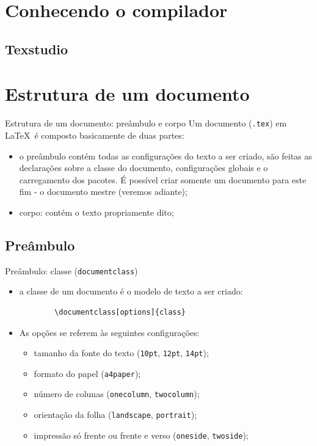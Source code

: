 \documentclass[c]{beamer}
\begin{document}
{\section{Conhecendo o compilador}
\subsection{Texstudio}


\section{Estrutura de um documento}



\begin{frame}[fragile]{\sc Estrutura de um documento: preâmbulo e corpo}
	Um documento (\verb|.tex|) em \LaTeX\ é composto basicamente de duas partes:
	\begin{itemize}	
		\setlength\itemsep{0.2cm}
		\item o {\color{blue} preâmbulo}  contém 
		todas as configurações do texto a ser criado, são feitas as declarações sobre a {\color{blue} classe} do documento, 
		{\color{blue} configurações globais} e o carregamento dos {\color{blue} pacotes}. 
        É possível criar somente um documento para este fim - o 
		{\color{blue} documento mestre} (veremos adiante);
		\item {\color{blue} corpo}: contém o texto propriamente dito;
	\end{itemize}
\end{frame}


\subsection{Preâmbulo}

\begin{frame}[fragile]{\sc Preâmbulo: classe (\texttt{documentclass})}
	\begin{itemize}
		\setlength\itemsep{0.2cm}
		\item a {\color{blue} classe} de um documento é o modelo de texto a ser criado:
		\begin{verbatim}
		\documentclass[options]{class}
		\end{verbatim}
  \item As {\color{blue} opções} se referem às seguintes configurações:
  \begin{itemize}
  	\item tamanho da fonte do texto (\verb|10pt|, \verb|12pt|, \verb|14pt|);
  	\item formato do papel (\verb|a4paper|);
  	\item número de colunas (\verb|onecolumn|, \verb|twocolumn|);
  	\item orientação da folha (\verb|landscape|, \verb|portrait|);
  	\item impressão só frente ou frente e verso (\verb|oneside|, \verb|twoside|);
  \end{itemize}
    \end{itemize}
\end{frame}


}
\end{document}

